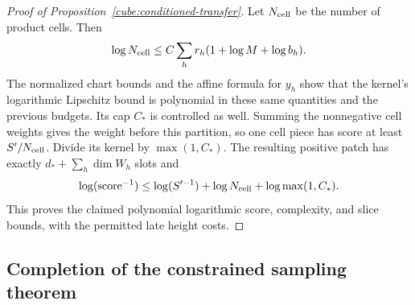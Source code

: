 \begin{proof}[Proof of Proposition~\ref{cube:conditioned-transfer}]
Let $N_{\rm cell}$ be the number of product cells.  Then
\[
 \log N_{\rm cell}
 \le C\sum_hr_h(1+\log M+\log b_h).
\]
The normalized chart bounds and the affine formula for $y_h$ show
that the kernel's logarithmic Lipschitz bound is polynomial in
these same quantities and the previous budgets.  Its cap $C_*$ is
controlled as well.  Summing the nonnegative cell weights gives the
weight before this partition, so one cell piece has score at least
$S'/N_{\rm cell}$.  Divide its kernel by $\max(1,C_*)$.
The resulting positive patch has exactly
$d_*+\sum_h\dim W_h$ slots and
\[
 \log(\text{score}^{-1})
 \le\log(S'^{-1})+\log N_{\rm cell}+\log\max(1,C_*).
\]
This proves the claimed polynomial logarithmic score, complexity,
and slice bounds, with the permitted late height costs.
\end{proof}

\subsection{Completion of the constrained sampling theorem}
\label{cube:sampler-proof}

